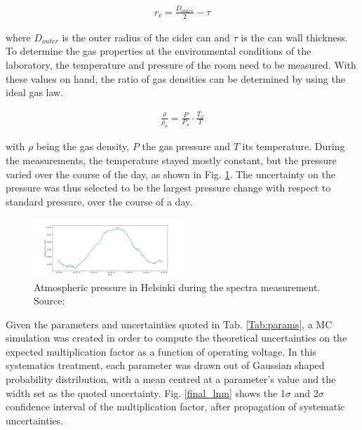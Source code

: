 \begin{align}
  \label{eq:rcra}
  r_{c} = \frac{D_{outer}}{2}-\tau
\end{align}

where $D_{outer}$ is the outer radius of the cider can and $\tau$ is the can wall thickness.
To determine the gas properties at the environmental conditions of the laboratory, the temperature and pressure of the room need to be measured. With these values on hand, the ratio of gas densities can be determined by using the ideal gas law.

\begin{align}
  \label{eq:gaslaw}
  \frac{\rho}{\rho_{o}} = \frac{P}{P_{o}}\cdot \frac{T_{o}}{T}
\end{align}

with $\rho$ being the gas density, $P$ the gas pressure and $T$ its temperature.
During the measurements, the temperature stayed mostly constant, but the pressure varied over the course of the day, as shown in Fig. \ref{fig:pressure}. The uncertainty on the pressure was thus selected to be the largest pressure change with respect to standard pressure, over the course of a day.

\begin{figure}[htb]
  \includegraphics[width=0.5\textwidth]{graphics/pressure_monitoring.png}
  \caption{Atmospheric pressure in Helsinki during the spectra measurement. Source: \cite{meteo}}
  \label{fig:pressure}
\end{figure}

Given the parameters and uncertainties quoted in Tab. \ref{Tab:params}, a MC simulation was created in order to compute the theoretical uncertainties on the expected multiplication factor as a function of operating voltage. In this systematics treatment, each parameter was drawn out of Gaussian shaped probability distribution, with a mean centred at a parameter's value and the width set as the quoted uncertainty. Fig. \ref{final_lnm} shows the 1$\sigma$ and 2$\sigma$ confidence interval of the multiplication factor, after propagation of systematic uncertainties.



